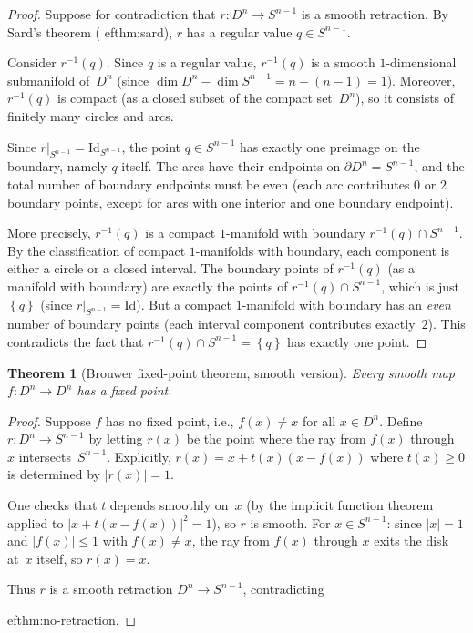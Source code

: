 \documentclass[12pt,a4paper,openany]{book}
\newtheorem{theorem}{Theorem}[section]
\theoremstyle{definition}
\theoremstyle{remark}
\newcommand{\Id}{\mathrm{Id}}
\newcommand{\abs}[1]{\left\lvert #1 \right\rvert}
\newcommand{\set}[1]{\left\{ #1 \right\}}
\begin{document}
\begin{proof}
Suppose for contradiction that $r\colon D^n\to S^{n-1}$ is a smooth
retraction.  By Sard's theorem (
ef{thm:sard}), $r$ has a regular
value $q\in S^{n-1}$.

Consider $r^{-1}(q)$.  Since $q$ is a regular value, $r^{-1}(q)$ is
a smooth $1$-dimensional submanifold of~$D^n$ (since
$\dim D^n - \dim S^{n-1} = n - (n-1) = 1$).  Moreover, $r^{-1}(q)$
is compact (as a closed subset of the compact set~$D^n$), so it
consists of finitely many circles and arcs.

Since $r|_{S^{n-1}} = \Id_{S^{n-1}}$, the point $q\in S^{n-1}$ has
exactly one preimage on the boundary, namely $q$ itself.  The arcs have
their endpoints on $\partial D^n = S^{n-1}$, and the total number of
boundary endpoints must be even (each arc contributes $0$ or $2$
boundary points, except for arcs with one interior and one boundary
endpoint).

More precisely, $r^{-1}(q)$ is a compact $1$-manifold with boundary
$r^{-1}(q)\cap S^{n-1}$.  By the classification of compact
$1$-manifolds with boundary, each component is either a circle or a
closed interval.  The boundary points of $r^{-1}(q)$ (as a manifold
with boundary) are exactly the points of $r^{-1}(q)\cap S^{n-1}$,
which is just $\set{q}$ (since $r|_{S^{n-1}} = \Id$).  But a compact
$1$-manifold with boundary has an \emph{even} number of boundary
points (each interval component contributes exactly~$2$).
This contradicts the fact that $r^{-1}(q)\cap S^{n-1} = \set{q}$
has exactly one point.
\end{proof}

\begin{theorem}[Brouwer fixed-point theorem, smooth version]
  \label{thm:brouwer-smooth}
Every smooth map $f\colon D^n\to D^n$ has a fixed point.
\end{theorem}

\begin{proof}
Suppose $f$ has no fixed point, i.e., $f(x)\ne x$ for all $x\in D^n$.
Define $r\colon D^n\to S^{n-1}$ by letting $r(x)$ be the point where the
ray from $f(x)$ through~$x$ intersects~$S^{n-1}$.  Explicitly,
$r(x) = x + t(x)(x - f(x))$ where $t(x)\ge 0$ is determined by
$\abs{r(x)} = 1$.

One checks that $t$ depends smoothly on~$x$ (by the implicit function
theorem applied to $\abs{x+t(x-f(x))}^2 = 1$), so $r$ is smooth.
For $x\in S^{n-1}$: since $\abs{x} = 1$ and $\abs{f(x)}\le 1$ with
$f(x)\ne x$, the ray from $f(x)$ through $x$ exits the disk at~$x$
itself, so $r(x) = x$.

Thus $r$ is a smooth retraction $D^n\to S^{n-1}$, contradicting

ef{thm:no-retraction}.
\end{proof}
\end{document}
